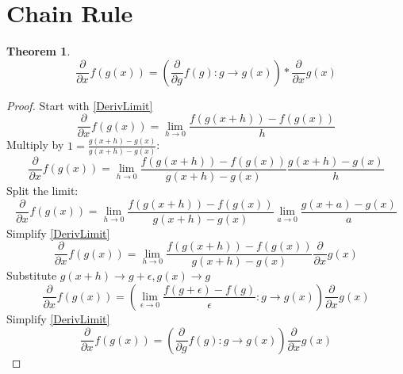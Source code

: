 \documentclass[]{article}
\newcommand{\pqty}[1]{{\left(#1\right)}}
\newcommand{\pdiff}[2]{\frac{\partial^{#2}}{\partial #1^{#2}}}
\newtheorem{theorem}{Theorem}[section]
\numberwithin{equation}{section}
\begin{document}
	\section{Chain Rule}
	\begin{theorem}
		\begin{equation}
		\label{DiffChainRule}
		\pdiff{x}{}{f\pqty{g\pqty{x}}}
		=\pqty{\pdiff{g}{}f\pqty{g}:g\to g\pqty{x}}*\pdiff{x}{}{g\pqty{x}}
		\end{equation}
	\end{theorem}
	\begin{proof}
		Start with \eqref{DerivLimit}
		\begin{equation}
		\pdiff{x}{}{f\pqty{g\pqty{x}}}
		=\lim\limits_{h\to 0}
		\frac{f\pqty{g\pqty{x+h}}-f\pqty{g\pqty{x}}}{h}
		\end{equation}
		Multiply by \(1=\frac{g\pqty{x+h}-g\pqty{x}}{g\pqty{x+h}-g\pqty{x}}\):
		\begin{equation}
		\pdiff{x}{}{f\pqty{g\pqty{x}}}
		=\lim\limits_{h\to 0}
		\frac{f\pqty{g\pqty{x+h}}-f\pqty{g\pqty{x}}}{g\pqty{x+h}-g\pqty{x}}
		\frac{g\pqty{x+h}-g\pqty{x}}{h}
		\end{equation}
		Split the limit:
		\begin{equation}
		\pdiff{x}{}{f\pqty{g\pqty{x}}}
		=\lim\limits_{h\to 0}
		\frac{f\pqty{g\pqty{x+h}}-f\pqty{g\pqty{x}}}{g\pqty{x+h}-g\pqty{x}}
		\lim\limits_{a\to 0}
		\frac{g\pqty{x+a}-g\pqty{x}}{a}
		\end{equation}
		Simplify \eqref{DerivLimit}
		\begin{equation}
		\pdiff{x}{}{f\pqty{g\pqty{x}}}
		=\lim\limits_{h\to 0}
		\frac{f\pqty{g\pqty{x+h}}-f\pqty{g\pqty{x}}}{g\pqty{x+h}-g\pqty{x}}
		\pdiff{x}{}{g\pqty{x}}
		\end{equation}
		Substitute \(g\pqty{x+h}\to g+\epsilon,g\pqty{x}\to g\)
		\begin{equation}
		\pdiff{x}{}{f\pqty{g\pqty{x}}}
		=\pqty{\lim\limits_{\epsilon\to 0}
		\frac{f\pqty{g+\epsilon}-f\pqty{g}}{\epsilon}:g\to g\pqty{x}}
		\pdiff{x}{}{g\pqty{x}}
		\end{equation}
		Simplify \eqref{DerivLimit}
		\begin{equation}
		\pdiff{x}{}{f\pqty{g\pqty{x}}}
		=\pqty{\pdiff{g}{}f\pqty{g}:g\to g\pqty{x}}
		\pdiff{x}{}{g\pqty{x}}
		\end{equation}
	\end{proof}
	
\end{document}
